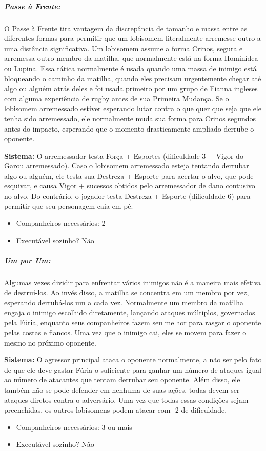 \begin{multicols}{2}
\subparagraph{\bf Passe à Frente:}
O Passe à Frente tira vantagem da discrepância de tamanho e massa entre as diferentes formas para permitir que um lobisomem literalmente arremesse outro a uma distância significativa. Um lobisomem assume a forma Crinos, segura e arremessa outro membro da matilha, que normalmente está na forma Hominídea ou Lupina. Essa tática normalmente é usada quando uma massa de inimigo está bloqueando o caminho da matilha, quando eles precisam urgentemente chegar até algo ou alguém atrás deles e foi usada primeiro por um grupo de Fianna ingleses com alguma experiência de rugby antes de sua Primeira Mudança. Se o lobisomem arremessado estiver esperando lutar contra o que quer que seja que ele tenha sido arremessado, ele normalmente muda sua forma para Crinos segundos antes do impacto, esperando que o momento drasticamente ampliado derrube o oponente.

{\bf Sistema:} O arremessador testa Força + Esportes (dificuldade 3 + Vigor do Garou arremessado). Caso o lobisomem arremessado esteja tentando derrubar algo ou alguém, ele testa sua Destreza + Esporte para acertar o alvo, que pode esquivar, e causa Vigor + sucessos obtidos pelo arremessador de dano contusivo no alvo. Do contrário, o jogador testa Destreza + Esporte (dificuldade 6) para permitir que seu personagem caia em pé.
\begin{itemize}[noitemsep]
\item Companheiros necessários: 2 
\item Executável sozinho? Não
\end{itemize}

\subparagraph{\bf Um por Um:}
Algumas vezes dividir para enfrentar vários inimigos não é a maneira mais efetiva de destruí-los. Ao invés disso, a matilha se concentra em um membro por vez, esperando derrubá-los um a cada vez. Normalmente um membro da matilha engaja o inimigo escolhido diretamente, lançando ataques múltiplos, governados pela Fúria, enquanto seus companheiros fazem seu melhor para rasgar o oponente pelas costas e flancos. Uma vez que o inimigo cai, eles se movem para fazer o mesmo no próximo oponente. 

{\bf Sistema:} O agressor principal ataca o oponente normalmente, a não ser pelo fato de que ele deve gastar Fúria o suficiente para ganhar um número de ataques igual ao número de atacantes que tentam derrubar seu oponente. Além disso, ele também não se pode defender em nenhuma de suas ações, todas devem ser ataques diretos contra o adversário. Uma vez que todas essas condições sejam preenchidas, os outros lobisomens podem atacar com -2 de dificuldade. 
\begin{itemize}[noitemsep]
\item Companheiros necessários: 3 ou mais
\item Executável sozinho? Não
\end{itemize}


\end{multicols}
